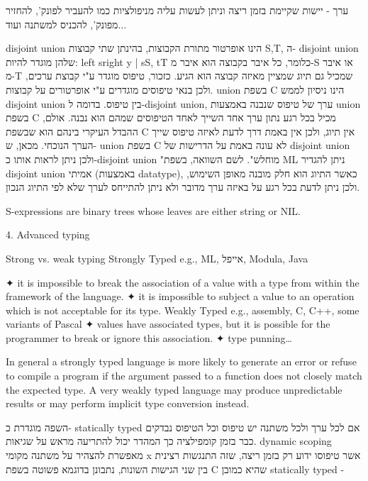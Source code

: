         ערך - יישות שקיימת בזמן ריצה וניתן לעשות עליה מניפולציות כמו להעביר לפונק', להחזיר מפונק', להכניס למשתנה ועוד...

        disjoint union הינו אופרטור מתורת הקבוצות, בהינתן שתי קבוצות S,T, ה- disjoint union שלהן מוגדר להיות:
        {left sright y | sS, tT}
        כלומר, כל איבר בקבוצה הוא איבר מ-S או איבר מ-T שמכיל גם תיוג שמציין מאיזה קבוצה הוא הגיע.
        כזכור, טיפוס מוגדר ע"י קבוצת ערכים, ולכן בנאי טיפוסים מוגדרים ע"י אופרטורים על קבוצות.
        union בשפת C הינו ניסיון לממש disjoint union בין טיפוס.
        בדומה ל-disjoint union, ערך של טיפוס שנבנה באמצעות union בשפת C מכיל בכל רגע נתון ערך אחד השייך לאחד הטיפוסים שמהם הוא נבנה.
        אולם, ההבדל העיקרי בינהם הוא שבשפת C אין תיוג, ולכן אין באמת דרך לדעת לאיזה טיפוס שייך הערך הנוכחי.
        מכאן, ש- union בשפת C לא עונה באמת על הדרישות של disjoint union ולכן ניתן לראות אותו כ-disjoint union "מוחלש".
        לשם השוואה, בשפת ML ניתן להגדיר disjoint union אמיתי (באמצעות datatype), כאשר התיוג הוא חלק מובנה מאופן השימוש, ולכן ניתן לדעת בכל רגע על באיזה ערך מדובר ולא ניתן להתייחס לערך שלא לפי התיוג הנכון.

        S-expressions are binary trees whose leaves are either string or NIL.

        4. Advanced typing

        Strong vs. weak typing
        Strongly Typed e.g., ML, אייפל, Modula, Java
        \begin{ציינון}
          ✦ it is impossible to break the association of a value
          with a type from within the framework of the language.
          ✦ it is impossible to subject a value to an operation
          which is not acceptable for its type.
          Weakly Typed e.g., assembly, C, C++, some variants of Pascal
          ✦ values have associated types, but it is possible for
          the programmer to break or ignore this association.
          ✦ type punning…
        \end{ציינון}

        In general a strongly typed language is more likely to generate an error or refuse to compile a program if the argument passed to a function does not closely match the expected type. A very weakly typed language may produce unpredictable results or may perform implicit type conversion instead.

        השפה מוגדרת כ- statically typed אם לכל ערך ולכל משתנה יש טיפוס וכל הטיפוס נבדקים כבר בזמן קומפילציה כך המהדר יכול להתריעה מראש על שגיאות.
        dynamic scoping מאפשרת להצהיר על משתנה מקומי x אשר טיפוסו ידוע רק בזמן ריצה, שזה התנגשות רצינית בין שני הגישות השונות, נתבונן בדוגמא פשוטה בשפת C שהיא כמובן statically typed -

